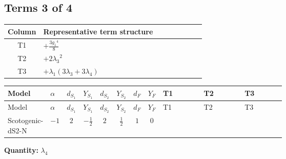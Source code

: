 \documentclass[8pt]{article}
\begin{document}
\begin{landscape}
\subsection*{Terms 3 of 4}
\begin{center}
\begin{tabular}{@{}c >{\raggedright\arraybackslash}p{0.82\linewidth}@{}}
\toprule
Column & Representative term structure \\
\midrule
T1 & \(\displaystyle +\frac{3 {g_1}^4}{8}\) \\
\midrule
T2 & \(\displaystyle +2 {\lambda_3}^2\) \\
\midrule
T3 & \(\displaystyle +{\lambda_1} (3 {\lambda_3}+3 {\lambda_4})\) \\
\midrule
\bottomrule
\end{tabular}
\end{center}
\smallskip
\tiny
\begin{longtable}{@{}llcccccc >{\raggedright\arraybackslash}p{0.21\linewidth} >{\raggedright\arraybackslash}p{0.21\linewidth} >{\raggedright\arraybackslash}p{0.21\linewidth}@{}}
\toprule
Model & $\alpha$ & $d_{S_1}$ & $Y_{S_1}$ & $d_{S_2}$ & $Y_{S_2}$ & $d_F$ & $Y_F$ & T1 & T2 & T3 \\
\midrule
\endfirsthead
\toprule
Model & $\alpha$ & $d_{S_1}$ & $Y_{S_1}$ & $d_{S_2}$ & $Y_{S_2}$ & $d_F$ & $Y_F$ & T1 & T2 & T3 \\
\midrule
\endhead
Scotogenic-dS2-N & $-1$ & $2$ & $-\frac{1}{2}$ & $2$ & $\frac{1}{2}$ & $1$ & $0$ & \scriptsize\adjustbox{max width=\linewidth}{$\begin{gathered} +\frac{3 {g_1}^4}{8}\end{gathered}$} & \scriptsize\adjustbox{max width=\linewidth}{$\begin{gathered} +2 {\lambda_3}^2\end{gathered}$} & \scriptsize\adjustbox{max width=\linewidth}{$\begin{gathered} +{\lambda_1} (3 {\lambda_3}+3 {\lambda_4})\end{gathered}$} \\
\midrule
\bottomrule
\end{longtable}
\clearpage
\noindent\textbf{Quantity: }$\lambda_4$\par\smallskip

\end{landscape}
\end{document}
